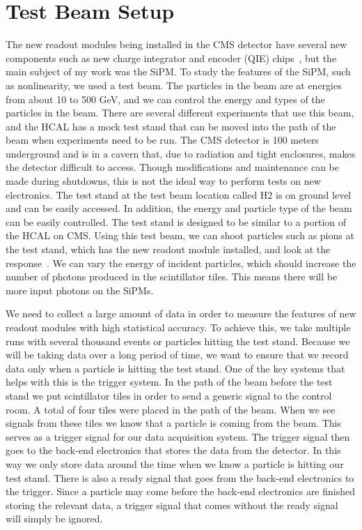 \section{Test Beam Setup}


The new readout modules being installed in the CMS detector have several new components such as new charge integrator and encoder (QIE) chips~\cite{QIE, QIE2}, but the main subject of my work was the SiPM. To study the features of the SiPM,  such as nonlinearity, we used a test beam. The particles in the beam are at energies from about 10 to 500 GeV, and we can control the energy and types of the particles in the beam. There are several different experiments that use this beam, and the HCAL has a mock test stand that can be moved into the path of the beam when experiments need to be run. The CMS detector is 100 meters underground and is in a cavern that, due to radiation and tight enclosures, makes the detector difficult to access. Though modifications and maintenance can be made during shutdowns, this is not the ideal way to perform tests on new electronics. The test stand at the test beam location called H2 is on ground level and can be easily accessed. In addition, the energy and particle type of the beam can be easily controlled. The test stand is designed to be similar to a portion of the HCAL on CMS. Using this test beam, we can shoot particles such as pions at the test stand, which has the new readout module installed, and look at the response~\cite{TB96, TB06}. We can vary the energy of incident particles, which should increase the number of photons produced in the scintillator tiles. This means there will be more input photons on the SiPMs.

We need to collect a large amount of data in order to measure the features of new readout modules with high statistical accuracy. To achieve this, we take multiple runs with several thousand events or particles hitting the test stand. Because we will be taking data over a long period of time, we want to ensure that we record data only when a particle is hitting the test stand. One of the key systems that helps with this is the trigger system. In the path of the beam before the test stand we put scintillator tiles in order to send a generic signal to the control room. A total of four tiles were placed in the path of the beam. When we see signals from these tiles we know that a particle is coming from the beam. This serves as a trigger signal for our data acquisition system. The trigger signal then goes to the back-end electronics that stores the data from the detector. In this way we only store data around the time when we know a particle is hitting our test stand. There is also a ready signal that goes from the back-end electronics to the trigger. Since a particle may come before the back-end electronics are finished storing the relevant data, a trigger signal that comes without the ready signal will simply be ignored.

